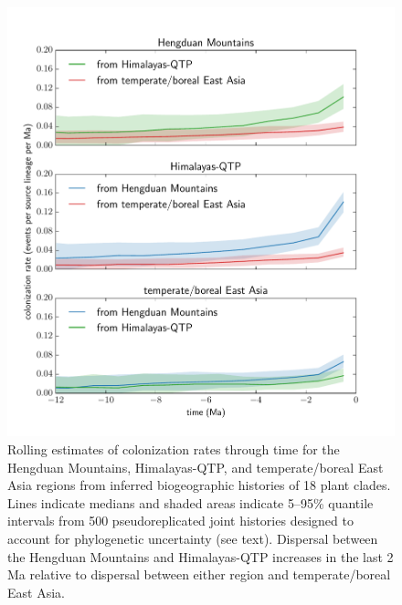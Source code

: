 \documentclass[9pt,twocolumn,twoside,lineno]{pnas-new}
\begin{document}
\begin{figure}
\centering
\includegraphics[width=.99\linewidth]{figures/figure_dispersal_rates/figure_dispersal_rates.pdf}
\caption{Rolling estimates of colonization rates through time for the
  Hengduan Mountains, Himalayas-QTP, and temperate/boreal East Asia
  regions from inferred biogeographic histories of 18 plant
  clades. Lines indicate medians and shaded areas indicate 5–95\%
  quantile intervals from 500 pseudoreplicated joint histories
  designed to account for phylogenetic uncertainty (see
  text). Dispersal between the Hengduan Mountains and Himalayas-QTP
  increases in the last 2 Ma relative to dispersal between either
  region and temperate/boreal East Asia.}
\label{fig:dispersal}
\end{figure}
\end{document}
